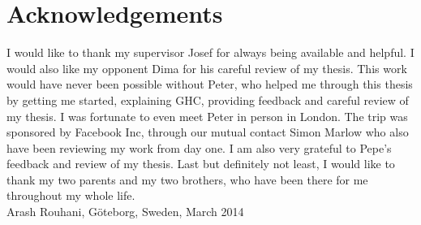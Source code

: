 \newpage
\clearpage
\mbox{}
\newpage
\clearpage
\thispagestyle{empty}
\section*{Acknowledgements}

I would like to thank my supervisor Josef for always being available and
helpful. I would also like my opponent Dima for his careful review of my
thesis. This work would have never been possible without Peter, who helped me
through this thesis by getting me started, explaining GHC, providing feedback
and careful review of my thesis. I was fortunate to even meet Peter in person
in London. The trip was sponsored by Facebook Inc, through our mutual contact
Simon Marlow who also have been reviewing my work from day one. I am also very
grateful to Pepe's feedback and review of my thesis.
Last but definitely not least, I would like to thank my two parents and my two
brothers, who have been there for me throughout my whole life.
\\[1cm]

\hfill Arash Rouhani, Göteborg, Sweden, March 2014

\newpage
\clearpage
\mbox{}
